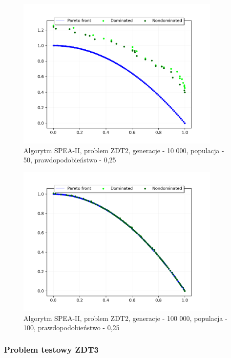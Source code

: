 \documentclass{classrep}
\begin{document}
\begin{figure}[H]
    \centering
    \includegraphics[width=0.9\textwidth]{img2/SPEAII_ZDT2_g10000_p50_r0,25.png}
    \caption{Algorytm SPEA-II, problem ZDT2, \newline generacje - 10 000, populacja - 50, prawdopodobieństwo - 0,25}
\end{figure}

\begin{figure}[H]
    \centering
    \includegraphics[width=0.9\textwidth]{img2/SPEAII_ZDT2_g100000_p100_r0,25.png}
    \caption{Algorytm SPEA-II, problem ZDT2, \newline generacje - 100 000, populacja - 100, prawdopodobieństwo - 0,25}
\end{figure}

\subsubsection{Problem testowy ZDT3}
\end{document}
